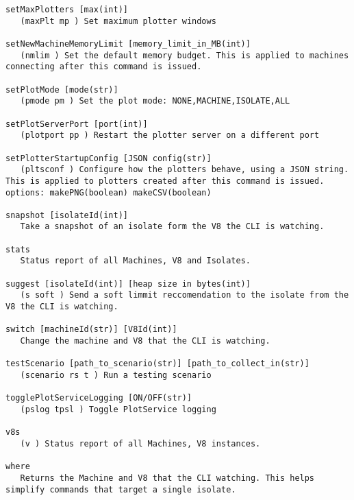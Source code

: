 \documentclass{l4proj}
\begin{document}
\begin{appendices}
\begin{lstlisting}
setMaxPlotters [max(int)]
   (maxPlt mp ) Set maximum plotter windows

setNewMachineMemoryLimit [memory_limit_in_MB(int)]
   (nmlim ) Set the default memory budget. This is applied to machines connecting after this command is issued.

setPlotMode [mode(str)]
   (pmode pm ) Set the plot mode: NONE,MACHINE,ISOLATE,ALL

setPlotServerPort [port(int)]
   (plotport pp ) Restart the plotter server on a different port

setPlotterStartupConfig [JSON config(str)]
   (pltsconf ) Configure how the plotters behave, using a JSON string. This is applied to plotters created after this command is issued. options: makePNG(boolean) makeCSV(boolean)

snapshot [isolateId(int)]
   Take a snapshot of an isolate form the V8 the CLI is watching.

stats
   Status report of all Machines, V8 and Isolates.

suggest [isolateId(int)] [heap size in bytes(int)]
   (s soft ) Send a soft limmit reccomendation to the isolate from the V8 the CLI is watching.

switch [machineId(str)] [V8Id(int)]
   Change the machine and V8 that the CLI is watching.

testScenario [path_to_scenario(str)] [path_to_collect_in(str)]
   (scenario rs t ) Run a testing scenario

togglePlotServiceLogging [ON/OFF(str)]
   (pslog tpsl ) Toggle PlotService logging

v8s
   (v ) Status report of all Machines, V8 instances.

where
   Returns the Machine and V8 that the CLI watching. This helps simplify commands that target a single isolate.
\end{lstlisting} 

\end{appendices}
\end{document}
